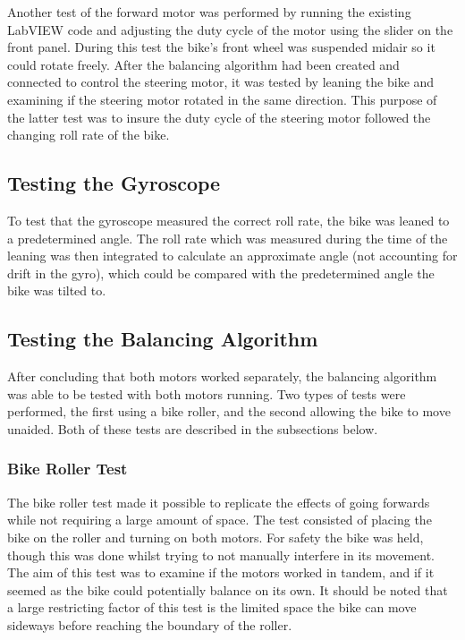 Another test of the forward motor was performed by running the existing LabVIEW code and adjusting the duty cycle of the motor using the slider on the front panel. During this test the bike's front wheel was suspended midair so it could rotate freely. After the balancing algorithm had been created and connected to control the steering motor, it was tested by leaning the bike and examining if the steering motor rotated in the same direction. This purpose of the latter test was to insure the duty cycle of the steering motor followed the changing roll rate of the bike.

\subsection{Testing the Gyroscope}

To test that the gyroscope measured the correct roll rate, the bike was leaned to a predetermined angle. The roll rate which was measured during the time of the leaning was then integrated to calculate an approximate angle (not accounting for drift in the gyro), which could be compared with the predetermined angle the bike was tilted to.

\subsection{Testing the Balancing Algorithm}

After concluding that both motors worked separately, the balancing algorithm was able to be tested with both motors running. Two types of tests were performed, the first using a bike roller, and the second allowing the bike to move unaided. Both of these tests are described in the subsections below.

\subsubsection{Bike Roller Test}

The bike roller test made it possible to replicate the effects of going forwards while not requiring a large amount of space. The test consisted of placing the bike on the roller and turning on both motors. For safety the bike was held, though this was done whilst trying to not manually interfere in its movement. The aim of this test was to examine if the motors worked in tandem, and if it seemed as the bike could potentially balance on its own. It should be noted that a large restricting factor of this test is the limited space the bike can move sideways before reaching the boundary of the roller.

